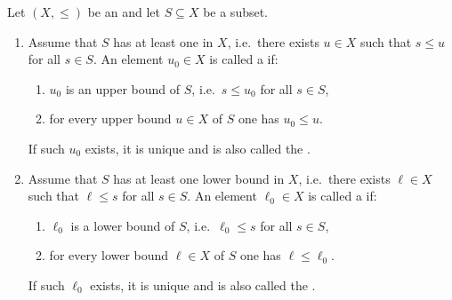 \begin{definition} \label{definition:least_upper_bound_and_greatest_lower_bound_of_a_subset_of_an_ordered_set}
Let $(X,\leq)$ be an  and let $S \subseteq X$ be a subset.
\begin{enumerate}
  \item Assume that $S$ has at least one  in $X$, i.e.\ there exists $u \in X$ such that $s \leq u$ for all $s \in S$.
  An element $u_0 \in X$ is called a  if:
  \begin{enumerate}
    \item $u_0$ is an upper bound of $S$, i.e.\ $s \leq u_0$ for all $s \in S$,
    \item for every upper bound $u \in X$ of $S$ one has $u_0 \leq u$.
  \end{enumerate}
  If such $u_0$ exists, it is unique and is also called the .

  \item Assume that $S$ has at least one lower bound in $X$, i.e.\ there exists $\ell \in X$ such that $\ell \leq s$ for all $s \in S$.
  An element $\ell_0 \in X$ is called a  if:
  \begin{enumerate}
    \item $\ell_0$ is a lower bound of $S$, i.e.\ $\ell_0 \leq s$ for all $s \in S$,
    \item for every lower bound $\ell \in X$ of $S$ one has $\ell \leq \ell_0$.
  \end{enumerate}
  If such $\ell_0$ exists, it is unique and is also called the .
\end{enumerate}
\end{definition}